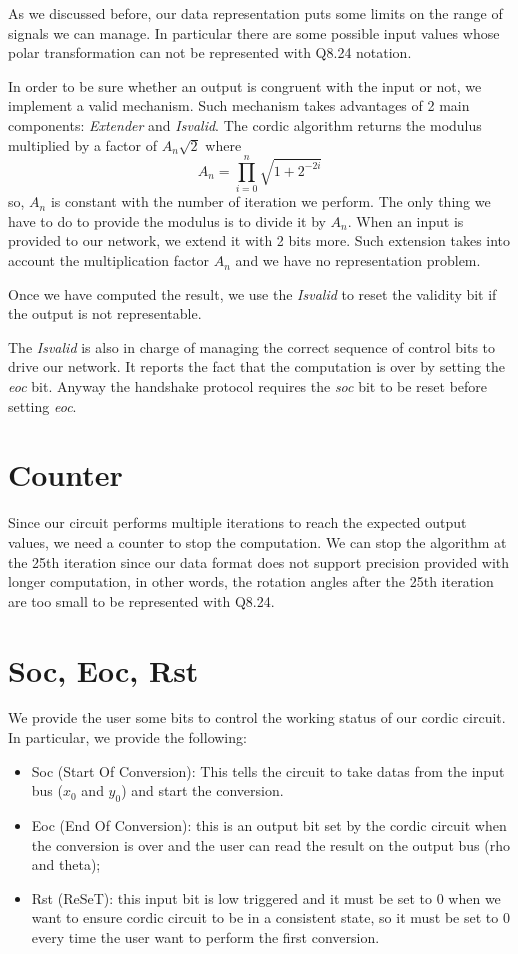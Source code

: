 \documentclass[12pt,a4paper]{report}
\begin{document}
As we discussed before, our data representation puts some limits on the range of signals we can manage. In particular there are some possible input values whose polar transformation can not be represented with Q8.24 notation.

In order to be sure whether an output is congruent with the input or not, we implement a valid mechanism.
Such mechanism takes advantages of 2 main components: \emph{Extender} and \emph{Is\textunderscore valid}.
The cordic algorithm returns the modulus multiplied by a factor of $A_{n}\sqrt{2}$ where 
\begin{equation}
A_n = \prod_{i = 0}^n{\sqrt{1+2^{-2i}}}
\end{equation}
so, $A_n$ is constant with the number of iteration we perform. The only thing we have to do to provide the modulus is to divide it by $A_n$.
When an input is provided to our network, we extend it with 2 bits more. Such extension takes into account the multiplication factor $A_n$ and we have no representation problem.

Once we have computed the result, we use the \emph{Is\textunderscore valid} to reset the validity bit if the output is not representable.

The \emph{Is\textunderscore valid} is also in charge of managing the correct sequence of control bits to drive our network. It reports the fact that the computation is over by setting the \emph{eoc} bit. Anyway the handshake protocol requires the \emph{soc} bit to be reset before setting \emph{eoc}.

\section{Counter}
Since our circuit performs multiple iterations to reach the expected output values, we need a counter to stop the computation.
We can stop the algorithm at the 25th iteration since our data format does not support precision provided with longer computation, in other words, the rotation angles after the 25th iteration are too small to be represented with Q8.24.

\section{Soc, Eoc, Rst}
We provide the user some bits to control the working status of our cordic circuit. In particular, we provide the following:
\begin{itemize}
	\item Soc (Start Of Conversion): This tells the circuit to take datas from the input bus ($x_{0}$ and $y_0$) and start the conversion.
	\item Eoc (End Of Conversion): this is an output bit set by the cordic circuit when the conversion is over and the user can read the result on the output bus (rho and theta);
	\item Rst (ReSeT): this input bit is low triggered and it must be set to 0 when we want to ensure cordic circuit to be in a consistent state, so it must be set to 0 every time the user want to perform the first conversion.
\end{itemize}
\end{document}
